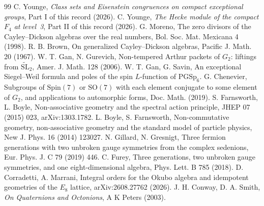 \documentclass[11pt]{amsart}
\theoremstyle{definition}
\begin{document}
\begin{thebibliography}{99}
 C. Younge, \emph{Class sets and Eisenstein congruences on compact exceptional groups}, Part I of this record (2026).
 C. Younge, \emph{The Hecke module of the compact $F_4$ at level~3}, Part II of this record (2026).
 G. Moreno, The zero divisors of the Cayley--Dickson algebras over the real numbers, Bol. Soc. Mat. Mexicana 4 (1998).
 R. B. Brown, On generalized Cayley--Dickson algebras, Pacific J. Math. 20 (1967).
 W. T. Gan, N. Gurevich, Non-tempered Arthur packets of $G_2$: liftings from $\widetilde{\mathrm{SL}}_2$, Amer. J. Math. 128 (2006).
 W. T. Gan, G. Savin, An exceptional Siegel--Weil formula and poles of the spin $L$-function of $\mathrm{PGSp}_6$.
 G. Chenevier, Subgroups of $\mathrm{Spin}(7)$ or $\mathrm{SO}(7)$ with each element conjugate to some element of $G_2$, and applications to automorphic forms, Doc. Math. (2019).
 S. Farnsworth, L. Boyle, Non-associative geometry and the spectral action principle, JHEP 07 (2015) 023, arXiv:1303.1782.
 L. Boyle, S. Farnsworth, Non-commutative geometry, non-associative geometry and the standard model of particle physics, New J. Phys. 16 (2014) 123027.
 N. Gillard, N. Gresnigt, Three fermion generations with two unbroken gauge symmetries from the complex sedenions, Eur. Phys. J. C 79 (2019) 446.
 C. Furey, Three generations, two unbroken gauge symmetries, and one eight-dimensional algebra, Phys. Lett. B 785 (2018).
 D. Corradetti, A. Marrani, Integral orders for the Okubo algebra and idempotent geometries of the $E_8$ lattice, arXiv:2608.27762 (2026).
 J. H. Conway, D. A. Smith, \emph{On Quaternions and Octonions}, A K Peters (2003).
\end{thebibliography}
\end{document}
